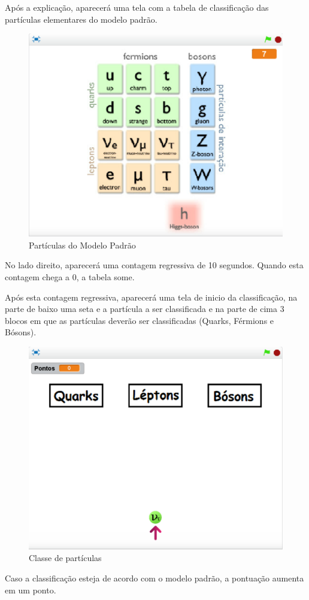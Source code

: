 \documentclass[12pt,fleqn]{book} %
\begin{document}
Após a explicação, aparecerá uma tela com a tabela de classificação das partículas elementares do modelo padrão.

\begin{figure}[h]
	\centering
	\includegraphics[width=0.65 \textwidth]{Produto/class2}
	\caption{Partículas do Modelo Padrão}
	\label{fig:app_a:class2}
\end{figure}

\newpage

No lado direito, aparecerá uma contagem regressiva de 10 segundos. Quando esta contagem chega a 0, a tabela some.

Após esta contagem regressiva, aparecerá uma tela de inicio da classificação, na parte de baixo uma seta e a partícula a ser classificada e na parte de cima 3 blocos em que as partículas deverão ser classificadas (Quarks, Férmions e Bósons).

\begin{figure}[h]
	\centering
	\includegraphics[width=0.65 \textwidth]{Produto/class3}
	\caption{Classe de partículas}
	\label{fig:app_a:class3}
\end{figure}

Caso a classificação esteja de acordo com o modelo padrão, a pontuação aumenta em um ponto.
\end{document}
